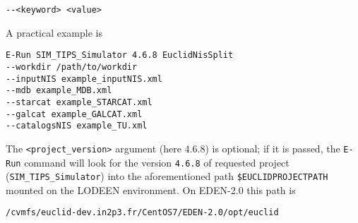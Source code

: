 \begin{verbatim}
--<keyword> <value>
\end{verbatim}

A practical example is

\begin{verbatim}
E-Run SIM_TIPS_Simulator 4.6.8 EuclidNisSplit
--workdir /path/to/workdir 
--inputNIS example_inputNIS.xml 
--mdb example_MDB.xml 
--starcat example_STARCAT.xml
--galcat example_GALCAT.xml  
--catalogsNIS example_TU.xml
\end{verbatim}

The \verb+<project_version>+ argument (here 4.6.8) is optional; if it is passed, the \verb+E-Run+ command will look for the version \verb+4.6.8+ of requested project (\verb+SIM_TIPS_Simulator+) into the aforementioned path \verb+$EUCLIDPROJECTPATH+ mounted on the LODEEN environment. On EDEN-2.0 this path is

\begin{verbatim}
/cvmfs/euclid-dev.in2p3.fr/CentOS7/EDEN-2.0/opt/euclid
\end{verbatim}